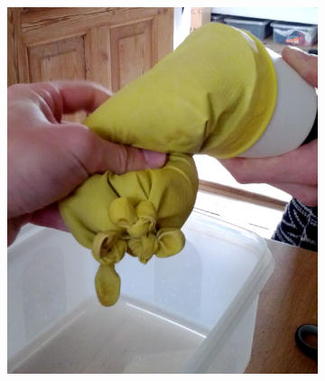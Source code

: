 \begin{figure}[h]
\begin{subfigure}[t]{.28\textwidth}
    \includegraphics[width=\linewidth]{figures/jamming/concepts/blobs/glove-2}
    \label{fig:ch:jamming:concepts:blobs:g2}
  \end{subfigure}
  \hspace{0.03\textwidth}
  \begin{subfigure}[t]{.28\textwidth}
    \centering

\end{subfigure}
\end{figure}
